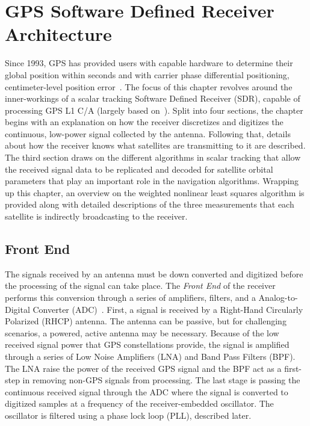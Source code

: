 \chapter{GPS Software Defined Receiver Architecture}\label{chpater:scalartracking}
Since 1993, GPS has provided users with capable hardware to determine their global position within seconds and with carrier phase differential positioning, centimeter-level position error~\cite{humphreysLowcostPreciseVehicular2018}. The focus of this chapter revolves around the inner-workings of a scalar tracking Software Defined Receiver (SDR), capable of processing GPS L1 C/A (largely based on~\cite{millerSNAPXonaSpace2023}). Split into four sections, the chapter begins with an explanation on how the receiver discretizes and digitizes the continuous, low-power signal collected by the antenna. Following that, details about how the receiver knows what satellites are transmitting to it are described. The third section draws on the different algorithms in scalar tracking that allow the received signal data to be replicated and decoded for satellite orbital parameters that play an important role in the navigation algorithms. Wrapping up this chapter, an overview on the weighted nonlinear least squares algorithm is provided along with detailed descriptions of the three measurements that each satellite is indirectly broadcasting to the receiver.

\section{\textbf{Front End}}
The signals received by an antenna must be down converted and digitized before the processing of the signal can take place. The \textit{Front End} of the receiver performs this conversion through a series of amplifiers, filters, and a Analog-to-Digital Converter (ADC)~\cite{kaplanUnderstandingGPSPrinciples2006}. First, a signal is received by a Right-Hand Circularly Polarized (RHCP) antenna. The antenna can be passive, but for challenging scenarios, a powered, active antenna may be necessary. Because of the low received signal power that GPS constellations provide, the signal is amplified through a series of Low Noise Amplifiers (LNA) and Band Pass Filters (BPF). The LNA raise the power of the received GPS signal and the BPF act as a first-step in removing non-GPS signals from processing. The last stage is passing the continuous received signal through the ADC where the signal is converted to digitized samples at a frequency of the receiver-embedded oscillator. The oscillator is filtered using a phase lock loop (PLL), described later.

